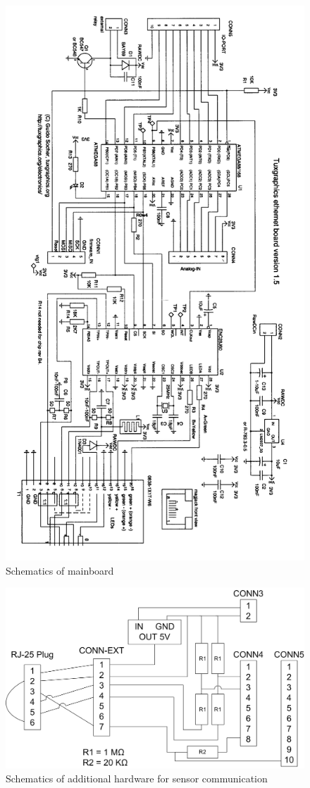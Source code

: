 \begin{figure}[ht]
    \centering
    \includegraphics[width=0.7\linewidth]{graphics/schematics1.png}
    \caption{Schematics of mainboard}
    \label{fig:mainboard_schematic1}
\end{figure}

\begin{figure}[ht]
    \centering
    \includegraphics[width=\linewidth]{graphics/schematics.png}
    \caption{Schematics of additional hardware for sensor communication}
    \label{fig:mainboard_schematic}
\end{figure}


